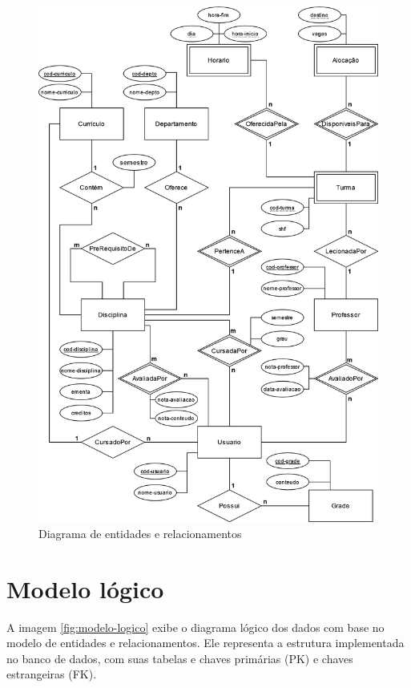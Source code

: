\begin{figure}[ht]
    \begin{center}
    \includegraphics[width=390pt]{figuras/diagrama-er-chen.png}
    \caption{Diagrama de entidades e relacionamentos}
    \label{fig:diagrama-classes}
    \end{center}
\end{figure}

\section{Modelo lógico}

A imagem \ref{fig:modelo-logico} exibe o diagrama lógico dos dados com base no modelo de entidades e relacionamentos. Ele representa a estrutura implementada no banco de dados, com suas tabelas e chaves primárias (PK) e chaves estrangeiras (FK).


